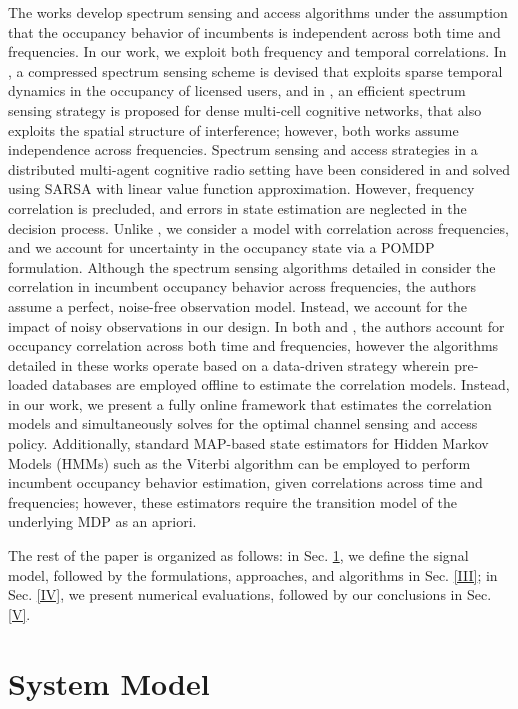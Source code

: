 \documentclass[10pt,twocolumn]{IEEEtran}
\begin{document}
The works \cite{7094730, 7895211} develop spectrum sensing and access algorithms under the assumption that the occupancy behavior of incumbents is independent across both time and frequencies. In our work, we exploit both frequency and temporal correlations. In \cite{7336513}, a compressed spectrum sensing scheme is devised that exploits sparse temporal dynamics in the occupancy of licensed users, and in \cite{8571293}, an efficient spectrum sensing strategy is proposed for dense multi-cell cognitive networks, that also exploits the spatial structure of interference; however, both works assume independence across frequencies. Spectrum sensing and access strategies in a distributed multi-agent cognitive radio setting have been considered in \cite{6507570} and solved using SARSA with linear value function approximation. However, frequency correlation is precluded, and errors in state estimation are neglected in the decision process. Unlike \cite{6507570}, we consider a model with correlation across frequencies, and we account for uncertainty in the occupancy state via a POMDP formulation. Although the spectrum sensing algorithms detailed in \cite{6956794} consider the correlation in incumbent occupancy behavior across frequencies, the authors assume a perfect, noise-free observation model. Instead, we account for the impact of noisy observations in our design. In both \cite{6956794} and \cite{4554696}, the authors account for occupancy correlation across both time and frequencies, however the algorithms detailed in these works operate based on a data-driven strategy wherein pre-loaded databases are employed offline to estimate the correlation models. Instead, in our work,  we present a fully online framework that estimates the correlation models and simultaneously solves for the optimal channel sensing and access policy. Additionally, standard MAP-based state estimators for  Hidden Markov Models (HMMs) such as the Viterbi algorithm can be employed to perform incumbent occupancy behavior estimation, given correlations across time and frequencies; however, these estimators require the transition model of the underlying MDP as an apriori.

The rest of the paper is organized as follows: in Sec. \ref{II}, we define the signal model, followed by the formulations, approaches, and algorithms in Sec. \ref{III}; in Sec. \ref{IV}, we present numerical evaluations, followed by our conclusions in Sec. \ref{V}.
\section{System Model}\label{II}
\end{document}
